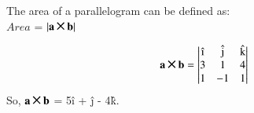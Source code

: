%      
%      
%      
%      
%      
The area of a parallelogram can be defined as:\\
$Area$ = $\abs{\vec{a} \Cross \vec{b}} $

\begin{equation}
\begin{aligned}
    \vec{a} \Cross \vec{b} = \begin{vmatrix}
      $\^i$       & $\^j$    & $\^k$ \\ 
      3       & 1    & 4 \\
      1       & -1     & 1 \\
      
    \end{vmatrix}
\end{aligned}
\end{equation}
So, $\vec{a} \Cross \vec{b}$ = 5\^i + \^j - 4\^k.\\


